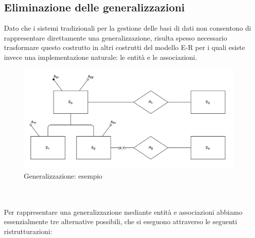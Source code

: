 \subsection{Eliminazione delle generalizzazioni}
Dato che i sistemi tradizionali per la gestione delle basi di dati non consentono di rappresentare direttamente una generalizzazione, risulta spesso necessario trasformare questo costrutto in altri costrutti del modello E-R per i quali esiste invece una implementazione naturale: le entità e le associazioni.
     \begin{figure}
        \centering
        \includegraphics[scale=0.6]{15/img0}
        \caption{Generalizzazione: esempio}
    \end{figure}\\\\
Per rappresentare una generalizzazione mediante entità e associazioni abbiamo essenzialmente tre alternative possibili, che si eseguono attraverso le seguenti ristrutturazioni:
